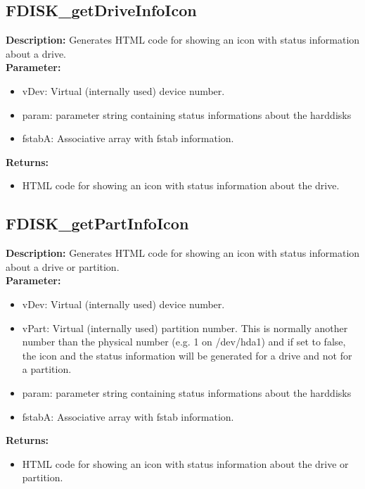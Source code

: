 \subsection{FDISK\_getDriveInfoIcon}
\textbf{Description:} Generates HTML code for showing an icon with status information about a drive.\\
\textbf{Parameter:}
\begin{itemize}
\item vDev: Virtual (internally used) device number.
\item param: parameter string containing status informations about the harddisks
\item fstabA: Associative array with fstab information.
\end{itemize}
\textbf{Returns:}
\begin{itemize}
\item HTML code for showing an icon with status information about the drive.
\end{itemize}

\subsection{FDISK\_getPartInfoIcon}
\textbf{Description:} Generates HTML code for showing an icon with status information about a drive or partition.\\
\textbf{Parameter:}
\begin{itemize}
\item vDev: Virtual (internally used) device number.
\item vPart: Virtual (internally used) partition number. This is normally another number than the physical number (e.g. 1 on /dev/hda1) and if set to false, the icon and the status information will be generated for a drive and not for a partition.
\item param: parameter string containing status informations about the harddisks
\item fstabA: Associative array with fstab information.
\end{itemize}
\textbf{Returns:}
\begin{itemize}
\item HTML code for showing an icon with status information about the drive or partition.
\end{itemize}

